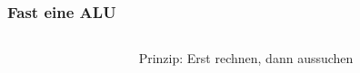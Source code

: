 \documentclass[t,aspectratio=169,usenames,dvipsnames]{beamer}
\begin{document}
\begin{frame}
  \frametitle{Fast eine ALU}

    \begin{columns}[T]
    \begin{column}{.45\textwidth}
    \end{column}
    \begin{column}{.45\textwidth}
      Prinzip: Erst rechnen, dann aussuchen


\end{column}
\end{columns}
\end{frame}
\end{document}
